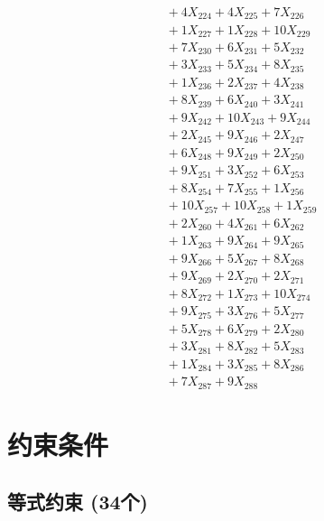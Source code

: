 \documentclass[a4paper,10pt]{article}
\begin{document}
{\begin{align}
&\;  + 4 X_{224} + 4 X_{225} + 7 X_{226} \\[0.3ex]
&\;  + 1 X_{227} + 1 X_{228} + 10 X_{229} \\[0.3ex]
&\;  + 7 X_{230} + 6 X_{231} + 5 X_{232} \\[0.3ex]
&\;  + 3 X_{233} + 5 X_{234} + 8 X_{235} \\[0.3ex]
&\;  + 1 X_{236} + 2 X_{237} + 4 X_{238} \\[0.3ex]
&\;  + 8 X_{239} + 6 X_{240} + 3 X_{241} \\[0.3ex]
&\;  + 9 X_{242} + 10 X_{243} + 9 X_{244} \\[0.3ex]
&\;  + 2 X_{245} + 9 X_{246} + 2 X_{247} \\[0.3ex]
&\;  + 6 X_{248} + 9 X_{249} + 2 X_{250} \\[0.5ex]\allowbreak
&\;  + 9 X_{251} + 3 X_{252} + 6 X_{253} \\[0.3ex]
&\;  + 8 X_{254} + 7 X_{255} + 1 X_{256} \\[0.3ex]
&\;  + 10 X_{257} + 10 X_{258} + 1 X_{259} \\[0.3ex]
&\;  + 2 X_{260} + 4 X_{261} + 6 X_{262} \\[0.3ex]
&\;  + 1 X_{263} + 9 X_{264} + 9 X_{265} \\[0.3ex]
&\;  + 9 X_{266} + 5 X_{267} + 8 X_{268} \\[0.3ex]
&\;  + 9 X_{269} + 2 X_{270} + 2 X_{271} \\[0.3ex]
&\;  + 8 X_{272} + 1 X_{273} + 10 X_{274} \\[0.3ex]
&\;  + 9 X_{275} + 3 X_{276} + 5 X_{277} \\[0.3ex]
&\;  + 5 X_{278} + 6 X_{279} + 2 X_{280} \\[0.5ex]\allowbreak
&\;  + 3 X_{281} + 8 X_{282} + 5 X_{283} \\[0.3ex]
&\;  + 1 X_{284} + 3 X_{285} + 8 X_{286} \\[0.3ex]
&\;  + 7 X_{287} + 9 X_{288}\nonumber
\end{align}
}

\section{约束条件}

\subsection{等式约束 (34个)}
\end{document}

